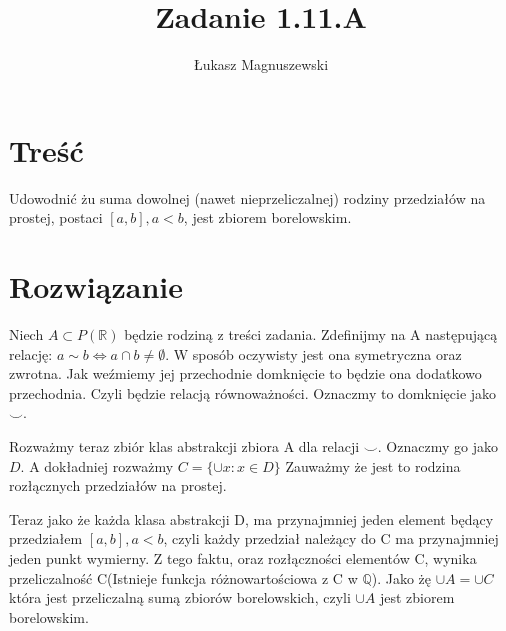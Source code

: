 \documentclass{article}
\title{Zadanie 1.11.A}
\author{Łukasz Magnuszewski}
\date{\vspace{-5ex}}
\begin{document}
\maketitle
\section*{Treść}
Udowodnić żu suma dowolnej (nawet nieprzeliczalnej) rodziny przedziałów na prostej, postaci $[a, b], a < b$, jest zbiorem borelowskim.

\section*{Rozwiązanie}
Niech $A \subset P(\mathbb{R})$ będzie rodziną z treści zadania. Zdefinijmy na A następującą relację:
$a \sim b \iff a \cap b \neq \emptyset$. W sposób oczywisty jest ona symetryczna oraz zwrotna. Jak weźmiemy jej przechodnie domknięcie to będzie ona dodatkowo przechodnia. Czyli będzie relacją równoważności. Oznaczmy to domknięcie jako $\smile$.

Rozważmy teraz zbiór klas abstrakcji zbiora A dla relacji $\smile$. Oznaczmy go jako $D$. A dokładniej rozważmy $C = \{ \cup x :  x \in D \}$ Zauważmy że jest to rodzina rozłącznych przedziałów na prostej.

Teraz jako że każda klasa abstrakcji D, ma przynajmniej jeden element będący przedziałem $[a, b], a < b$, czyli każdy przedział należący do C ma przynajmniej jeden punkt wymierny. Z tego faktu, oraz rozłączności elementów C, wynika przeliczalność C(Istnieje funkcja różnowartościowa z C w $\mathbb{Q}$).
Jako żę $\cup A = \cup C$ która jest przeliczalną sumą zbiorów borelowskich, czyli $\cup A$ jest zbiorem borelowskim.
\end{document}
